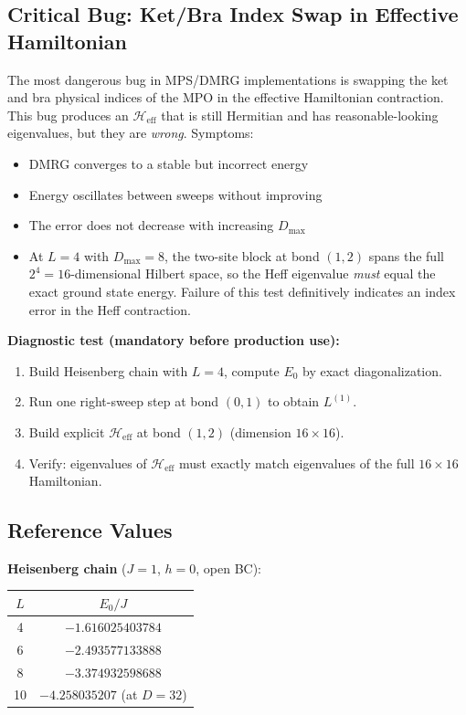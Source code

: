 \documentclass[aps,prb,onecolumn,scriptaddress]{revtex4-2}
\begin{document}
\subsection{Critical Bug: Ket/Bra Index Swap in Effective Hamiltonian}

The most dangerous bug in MPS/DMRG implementations is swapping the ket and bra physical indices of the MPO in the effective Hamiltonian contraction. This bug produces an $\mathcal{H}_{\text{eff}}$ that is still Hermitian and has reasonable-looking eigenvalues, but they are \emph{wrong}. Symptoms:
\begin{itemize}
\item DMRG converges to a stable but incorrect energy
\item Energy oscillates between sweeps without improving
\item The error does not decrease with increasing $D_{\max}$
		\item At $L=4$ with $D_{\max}=8$, the two-site block at bond $(1,2)$ spans the full $2^4 = 16$-dimensional Hilbert space, so the Heff eigenvalue \emph{must} equal the exact ground state energy. Failure of this test definitively indicates an index error in the Heff contraction.
\end{itemize}

\textbf{Diagnostic test (mandatory before production use):}
\begin{enumerate}
\item Build Heisenberg chain with $L=4$, compute $E_0$ by exact diagonalization.
\item Run one right-sweep step at bond $(0,1)$ to obtain $L^{(1)}$.
\item Build explicit $\mathcal{H}_{\text{eff}}$ at bond $(1,2)$ (dimension $16 \times 16$).
\item Verify: eigenvalues of $\mathcal{H}_{\text{eff}}$ must exactly match eigenvalues of the full $16 \times 16$ Hamiltonian.
\end{enumerate}

\subsection{Reference Values}

\textbf{Heisenberg chain} ($J=1$, $h=0$, open BC):
\begin{center}
\begin{tabular}{@{}cc@{}}
	\toprule
	$L$ & $E_0 / J$ \\
	\midrule
	4 & $-1.616025403784$ \\
	6 & $-2.493577133888$ \\
	8 & $-3.374932598688$ \\
	10 & $-4.258035207$ (at $D=32$) \\
	\bottomrule
\end{tabular}
\end{center}
\end{document}
